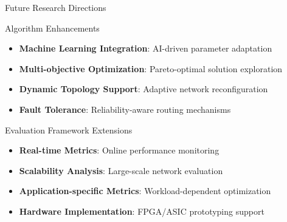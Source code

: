 \documentclass[10pt,aspectratio=169]{beamer}
\begin{document}
\begin{frame}{Future Research Directions}
    \begin{block}{Algorithm Enhancements}
        \begin{itemize}
            \item \textbf{Machine Learning Integration}: AI-driven parameter adaptation
            \item \textbf{Multi-objective Optimization}: Pareto-optimal solution exploration  
            \item \textbf{Dynamic Topology Support}: Adaptive network reconfiguration
            \item \textbf{Fault Tolerance}: Reliability-aware routing mechanisms
        \end{itemize}
    \end{block}
    
    \begin{block}{Evaluation Framework Extensions}
        \begin{itemize}
            \item \textbf{Real-time Metrics}: Online performance monitoring
            \item \textbf{Scalability Analysis}: Large-scale network evaluation
            \item \textbf{Application-specific Metrics}: Workload-dependent optimization
            \item \textbf{Hardware Implementation}: FPGA/ASIC prototyping support
        \end{itemize}
    \end{block}
\end{frame}
\end{document}
